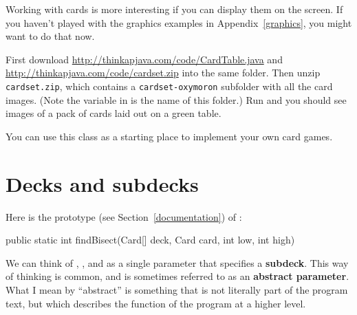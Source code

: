 \begin{exercise}
Working with cards is more interesting if you can display them on the screen.
If you haven't played with the graphics examples in Appendix~\ref{graphics}, you might want to do that now.

First download
\url{http://thinkapjava.com/code/CardTable.java}
and
\url{http://thinkapjava.com/code/cardset.zip} into the same folder.
Then unzip {\tt cardset.zip}, which contains a {\tt cardset-oxymoron}
subfolder with all the card images. (Note the variable 
in  is the name of this folder.)
Run  and you
should see images of a pack of cards laid out on a green table.

You can use this class as a starting place to implement your own
card games.
\end{exercise}



\section{Decks and subdecks}

Here is the prototype (see Section~\ref{documentation}) of :

\begin{code}
public static int findBisect(Card[] deck, Card card, int low, int high)
\end{code}


We can think of , , and  as a single parameter that specifies a {\bf subdeck}.
This way of thinking is common, and is sometimes referred to as an {\bf abstract parameter}.
What I mean by ``abstract'' is something that is not literally part of the program text, but which describes the function of the program at a higher level.

